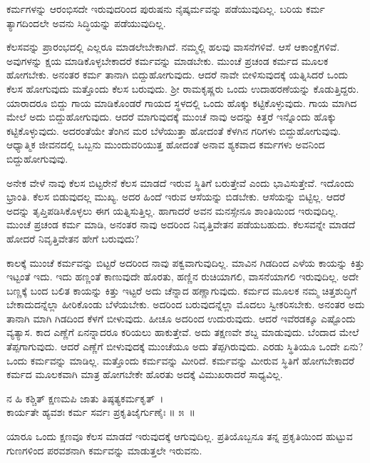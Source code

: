 \begin{artha}
ಕರ್ಮಗಳನ್ನು ಆರಂಭಿಸದೇ ಇರುವುದರಿಂದ ಪುರುಷನು ನೈಷ್ಕರ್ಮವನ್ನು ಪಡೆಯುವುದಿಲ್ಲ. ಬರಿಯ ಕರ್ಮ ತ್ಯಾಗದಿಂದಲೇ ಅವನು ಸಿದ್ಧಿಯನ್ನು ಪಡೆಯುವುದಿಲ್ಲ.
\end{artha}

ಕೆಲಸವನ್ನು ಪ್ರಾರಂಭದಲ್ಲಿ ಎಲ್ಲರೂ ಮಾಡಲೇಬೇಕಾಗಿದೆ. ನಮ್ಮಲ್ಲಿ ಹಲವು ವಾಸನೆಗಳಿವೆ. ಆಸೆ ಆಕಾಂಕ್ಷೆಗಳಿವೆ. ಅವುಗಳನ್ನು ಕ್ಷಯ ಮಾಡಿಕೊಳ್ಳಬೇಕಾದರೆ ಕರ್ಮವನ್ನು ಮಾಡಬೇಕು. ಮುಂಚೆ ಪ್ರಚಂಡ ಕರ್ಮದ ಮೂಲಕ ಹೋಗಬೇಕು. ಅನಂತರ ಕರ್ಮ ತಾನಾಗಿ ಬಿದ್ದುಹೋಗುವುದು. ಆದರೆ ನಾವೇ ಬೀಳಿಸುವುದಕ್ಕೆ ಯತ್ನಿಸಿದರೆ ಒಂದು ಕೆಲಸ ಹೋಗುವುದು ಮತ್ತೊಂದು ಕೆಲಸ ಬರುವುದು. ಶ‍್ರೀ ರಾಮಕೃಷ್ಣರು ಒಂದು ಉದಾಹರಣೆಯನ್ನು ಕೊಡುತ್ತಿದ್ದರು. ಯಾರಾ\-ದರೂ ಬಿದ್ದು ಗಾಯ ಮಾಡಿಕೊಂಡರೆ ಗಾಯದ ಸ್ಥಳದಲ್ಲಿ ಒಂದು ಹೊಕ್ಕು ಕಟ್ಟಿಕೊಳ್ಳುವುದು. ಗಾಯ ಮಾಗಿದ ಮೇಲೆ ಅದು ಬಿದ್ದುಹೋಗುವುದು. ಆದರೆ ಮಾಗುವುದಕ್ಕೆ ಮುಂಚೆ ನಾವು ಅದನ್ನು ಕಿತ್ತರೆ ಇನ್ನೊಂದು ಹೊಕ್ಕು ಕಟ್ಟಿಕೊಳ್ಳುವುದು. ಅದರಂತೆಯೇ ತೆಂಗಿನ ಮರ ಬೆಳೆಯುತ್ತಾ ಹೋದಂತೆ ಕೆಳಗಿನ ಗರಿಗಳು ಬಿದ್ದುಹೋಗುವುವು. ಆಧ್ಯಾತ್ಮಿಕ ಜೀವನದಲ್ಲಿ ಒಬ್ಬನು ಮುಂದುವರಿಯುತ್ತ ಹೋದಂತೆ ಅನಾವ ಶ್ಯಕವಾದ ಕರ್ಮಗಳು ಅವನಿಂದ ಬಿದ್ದುಹೋಗುವುವು.

ಅನೇಕ ವೇಳೆ ನಾವು ಕೆಲಸ ಬಿಟ್ಟರೇನೆ ಕೆಲಸ ಮಾಡದೆ ಇರುವ ಸ್ಥಿತಿಗೆ ಬರುತ್ತೇವೆ ಎಂದು ಭಾವಿಸುತ್ತೇವೆ. ಇದೊಂದು ಭ್ರಾಂತಿ. ಕೆಲಸ ಬಿಡುವುದಲ್ಲ ಮುಖ್ಯ. ಅದರ ಹಿಂದೆ ಇರುವ ಆಸೆಯನ್ನು ಬಿಡಬೇಕು. ಆಸೆಯನ್ನು ಬಿಟ್ಟಿಲ್ಲ. ಆದರೆ ಅದನ್ನು ತೃಪ್ತಿಪಡಿಸಿಕೊಳ್ಳಲು ಈಗ ಯತ್ನಿಸುತ್ತಿಲ್ಲ. ಹಾಗಾದರೆ ಅವನ ಮನಸ್ಸೇನೂ ಶಾಂತಿಯಿಂದ ಇರುವುದಿಲ್ಲ. ಮುಂಚೆ ಪ್ರಚಂಡ ಕರ್ಮ ಮಾಡಿ, ಅನಂತರ ನಾವು ಅದರಿಂದ ನಿವೃತ್ತಿವೇತನ ಪಡೆಯಬಹುದು. ಕೆಲಸವನ್ನೇ ಮಾಡದೆ ಹೋದರೆ ನಿವೃತ್ತಿವೇತನ ಹೇಗೆ ಬರುವುದು?

ಕಾಲಕ್ಕೆ ಮುಂಚೆ ಕರ್ಮವನ್ನು ಬಿಟ್ಟರೆ ಅದರಿಂದ ನಾವು ಪಕ್ವವಾಗುವುದಿಲ್ಲ. ಮಾವಿನ ಗಿಡದಿಂದ ಎಳೆಯ ಕಾಯನ್ನು ಕಿತ್ತು ಇಟ್ಟಂತೆ ಇದು. ಇದು ಹಣ್ಣಂತೆ ಕಾಣುವುದೇ ಹೊರತು, ಹಣ್ಣಿನ ರುಚಿಯಾಗಲಿ, ವಾಸನೆಯಾಗಲಿ ಇರುವುದಿಲ್ಲ. ಅದೇ ಬಣ್ಣಕ್ಕೆ ಬಂದ ಬಲಿತ ಕಾಯನ್ನು ಕಿತ್ತು ಇಟ್ಟರೆ ಅದು ಚೆನ್ನಾದ ಹಣ್ಣಾಗುವುದು. ಕರ್ಮದ ಮೂಲಕ ನಮ್ಮ ಚಿತ್ತಶುದ್ಧಿಗೆ ಬೇಕಾದುದನ್ನೆಲ್ಲಾ ಹೀರಿಕೊಂಡು ಬೆಳೆಯಬೇಕು. ಅದರಿಂದ ಬರುವುದನ್ನೆಲ್ಲಾ ಮೊದಲು ಸ್ವೀಕರಿಸಬೇಕು. ಅನಂತರ ಅದು ತಾನಾಗಿ ಮಾಗಿ ಗಿಡದಿಂದ ಕೆಳಗೆ ಬೀಳುವುದು. ಹೀಚೂ ಅದರಿಂದ ಉದುರುವುದು. ಆದರೆ ಇವೆರಡಕ್ಕೂ ಎಷ್ಟೊಂದು ವ್ಯತ್ಯಾಸ. ಕಾದ ಎಣ್ಣೆಗೆ ಏನನ್ನಾದರೂ ಕರಿಯಲು ಹಾಕುತ್ತೇವೆ. ಅದು ತಕ್ಷಣವೇ ಶಬ್ದ ಮಾಡುವುದು. ಬೆಂದಾದ ಮೇಲೆ ತೆಪ್ಪಗಾಗುವುದು. ಆದರೆ ಎಣ್ಣೆಗೆ ಬೀಳುವುದಕ್ಕೆ ಮುಂಚೆಯೂ ಅದು ತೆಪ್ಪಗಿರುವುದು. ಎರಡು ಸ್ಥಿತಿಯೂ ಒಂದೇ ಏನು? ಒಂದು ಕರ್ಮವನ್ನು ಮಾಡಿಲ್ಲ. ಮತ್ತೊಂದು ಕರ್ಮವನ್ನು ಮೀರಿದೆ. ಕರ್ಮವನ್ನು ಮೀರುವ ಸ್ಥಿತಿಗೆ ಹೋಗಬೇಕಾದರೆ ಕರ್ಮದ ಮೂಲಕವಾಗಿ ಮಾತ್ರ ಹೋಗಬೇಕೇ ಹೊರತು ಅದಕ್ಕೆ ವಿಮುಖರಾದರೆ ಸಾಧ್ಯವಿಲ್ಲ.

\begin{shloka}
ನ ಹಿ ಕಶ್ಚಿತ್ ಕ್ಷಣಮಪಿ ಜಾತು ತಿಷ್ಠತ್ಯಕರ್ಮಕೃತ್~।\\ಕಾರ್ಯತೇ ಹ್ಯವಶಃ ಕರ್ಮ ಸರ್ವಃ ಪ್ರಕೃತಿಜೈರ್ಗುಣೈಃ \hfill॥ ೫~॥
\end{shloka}

\begin{artha}
ಯಾರೂ ಒಂದು ಕ್ಷಣವೂ ಕೆಲಸ ಮಾಡದೆ ಇರುವುದಕ್ಕೆ ಆಗುವುದಿಲ್ಲ. ಪ್ರತಿಯೊಬ್ಬನೂ ತನ್ನ ಪ್ರಕೃತಿಯಿಂದ ಹುಟ್ಟುವ ಗುಣಗಳಿಂದ ಪರವಶನಾಗಿ ಕರ್ಮವನ್ನು ಮಾಡುತ್ತಲೇ ಇರುವನು.
\end{artha}

